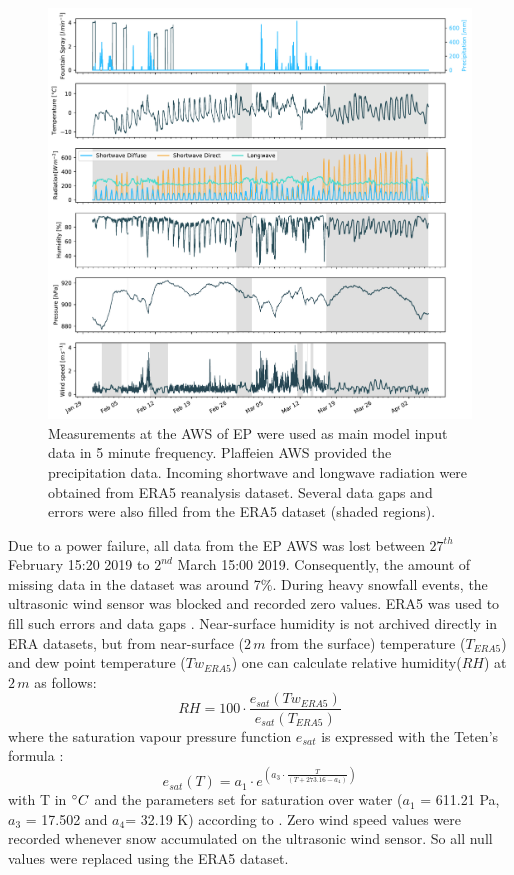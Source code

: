 \documentclass[utf8]{frontiersSCNS} %
\begin{document}
\begin{figure} \centering \includegraphics[width=\linewidth]{./Figures/Figure_3} \caption{Measurements at the AWS of
    EP were used as main model input data in 5 minute frequency. Plaffeien AWS provided the precipitation data.
    Incoming shortwave and longwave radiation were obtained from ERA5 reanalysis dataset. Several data gaps and errors
    were also filled from the ERA5 dataset (shaded regions).} \label{fig:input} \end{figure}

Due to a power failure, all data from the EP AWS was lost between $27^{th}$ February 15:20 2019 to $2^{nd}$ March 15:00
2019. Consequently, the amount of missing data in the dataset was around 7\%.  During heavy snowfall events, the
ultrasonic wind sensor was blocked and recorded zero values. ERA5 was used to fill such errors and data gaps .
Near-surface humidity is not archived directly in ERA datasets, but from near-surface ($2\,m$ from the surface)
temperature ($T_{ERA5}$) and dew point temperature ($Tw_{ERA5}$) one can calculate relative humidity($RH$) at $2\,m$ as
follows: \begin{equation} RH = 100 \cdot \frac{e_{sat}(Tw_{ERA5})}{e_{sat}(T_{ERA5})} \end{equation} where the
saturation vapour pressure function $e_{sat}$ is expressed with the Teten's formula \citep{Tetens}: \begin{equation}
e_{sat}(T)= a_1 \cdot e^{(a_3 \cdot \frac{T}{(T+273.16-a_4)})} \end{equation} with T in $\degree C$ and the parameters
set for saturation over water ($a_1$ = 611.21 Pa, $a_3$ = 17.502 and $a_4$= 32.19 K) according to \cite{Buck_1981}.
Zero wind speed values were recorded whenever snow accumulated on the ultrasonic wind sensor. So all null values were
replaced using the ERA5 dataset. 
\end{document}
